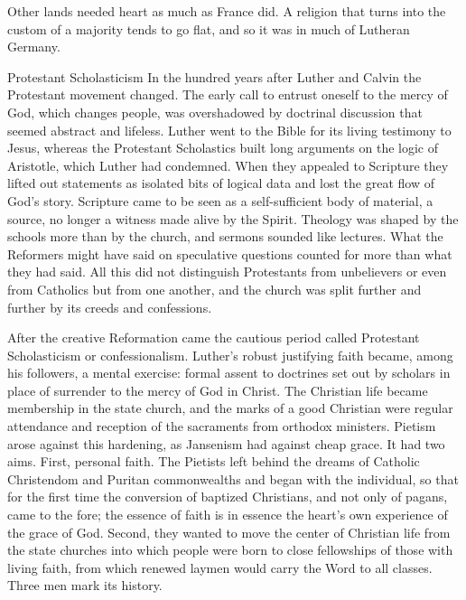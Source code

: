 Other lands needed heart as much as France did. A religion that turns into the custom of a majority
tends to go flat, and so it was in much of Lutheran Germany.

\begin{sidebox}{Protestant Scholasticism}
In the hundred years after Luther and Calvin the Protestant movement changed. The early call to
entrust oneself to the mercy of God, which changes people, was overshadowed by doctrinal discussion that seemed abstract
and lifeless. Luther went to the Bible for its living testimony to Jesus, whereas the Protestant Scholastics
built long arguments on the logic of Aristotle, which Luther had condemned. When they appealed to
Scripture they lifted out statements as isolated bits of logical data and lost the great flow of
God's story. Scripture came to be seen as a self-sufficient body of material, a source, no longer a
witness made alive by the Spirit. Theology was shaped by the schools more than by the church, and
sermons sounded like lectures. What the Reformers might have said on speculative questions counted for more than what they had said. All this did not distinguish Protestants from unbelievers or even from
Catholics but from one another, and the church was split further and further by its creeds and confessions.
\end{sidebox}

After the creative Reformation came the cautious period called Protestant Scholasticism or
confessionalism. Luther's robust justifying faith became, among his followers, a mental exercise:
formal assent to doctrines set out by scholars in place of surrender to the mercy of God in Christ.
The Christian life became membership in the state church, and the marks of a good Christian were
regular attendance and reception of the sacraments from orthodox ministers. Pietism arose against
this hardening, as Jansenism had against cheap grace. It had two aims. First, personal faith. The
Pietists left behind the dreams of Catholic Christendom and Puritan commonwealths and began with the
individual, so that for the first time the conversion of baptized Christians, and not only of pagans,
came to the fore; the essence of faith is in essence the heart's own experience of the grace of God. Second,
they wanted to move the center of Christian life from the state churches into which people were born
to close fellowships of those with living faith, from which renewed laymen would carry the Word to
all classes. Three men mark its history.

